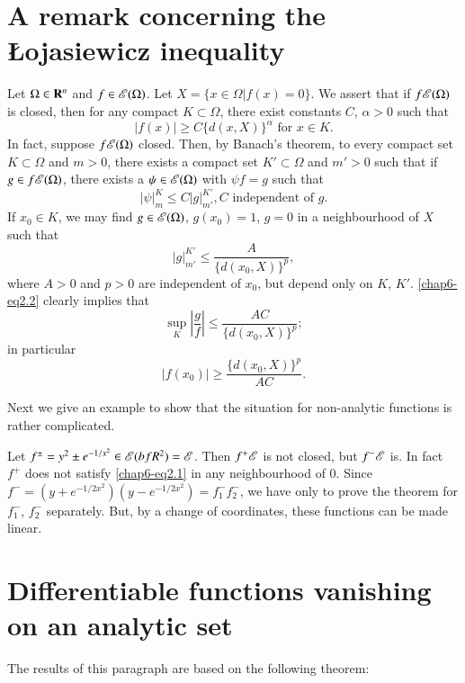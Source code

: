 \section{A remark concerning the {\L}ojasiewicz inequality}\label{chap6-sec2}

Let $\Omega\in \mathbf{R}^{n}$ and $f\in \mathscr{E}(\Omega)$. Let $X=\{x\in \Omega|f(x)=0\}$. We assert that if $f\mathscr{E}(\Omega)$ is closed, then for any compact $K\subset \Omega$, there exist constants $C$, $\alpha>0$ such that
\setcounter{equation}{0}
\begin{equation}
|f(x)|\geq C\{d(x,X)\}^{\alpha}\text{ for } x\in K.\label{chap6-eq2.1}
\end{equation}
In fact, suppose $f\mathscr{E}(\Omega)$ closed. Then, by Banach's theorem, to every compact set $K\subset \Omega$ and $m>0$, there exists a compact set $K'\subset \Omega$ and $m'>0$ such that if $g\in f\mathscr{E}(\Omega)$, there exists a $\psi\in \mathscr{E}(\Omega)$ with $\psi f=g$ such that
\begin{equation}
|\psi|^{K}_{m}\leq C|g|^{K'}_{m'}, C\text{ independent of } g.\label{chap6-eq2.2}
\end{equation}
If $x_{0}\in K$, we may find $g\in\mathscr{E}(\Omega)$, $g(x_{0})=1$, $g=0$ in a neighbourhood of $X$ such that
$$
|g|^{K'}_{m'}\leq \dfrac{A}{\{d(x_{0},X)\}^{p}},
$$
where $A>0$ and $p>0$ are independent of $x_{0}$, but depend only on $K$, $K'$. \eqref{chap6-eq2.2} clearly implies that
$$
\sup\limits_{K}\left|\dfrac{g}{f}\right|\leq \dfrac{AC}{\{d(x_{0},X)\}^{p}};
$$
in particular
$$
|f(x_{0})|\geq \dfrac{\{d(x_{0},X)\}^{p}}{AC}.
$$

Next we give an example to show that the situation for non-analytic functions is rather complicated.

Let $f^{\pm}=y^{2}\pm e^{-1/x^{2}}\in \mathscr{E}(bfR^{2})=\mathscr{E}$. Then $f^{+}\mathscr{E}$ is not closed, but $f^{-}\mathscr{E}$ is. In fact $f^{+}$ does not satisfy \eqref{chap6-eq2.1} in any neighbourhood of $0$. Since $f^{-}=(y+e^{-1/2x^{2}})(y-e^{-1/2x^{2}})=f^{-}_{1}f^{-}_{2}$, we have only to prove the theorem for $f^{-}_{1}$, $f^{-}_{2}$ separately. But, by a change of coordinates, these functions can be made linear.

\section{Differentiable functions vanishing on an analytic set}\label{chap6-sec3}

The results of this paragraph are based on the following theorem:

